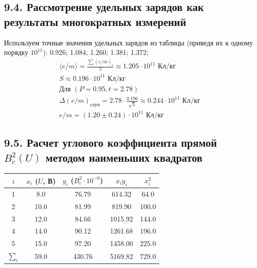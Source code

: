 \documentclass[a4paper,12pt]{article}
\begin{document}
\subsection*{9.4. Рассмотрение удельных зарядов как результаты многократных измерений}
Используем точные значения удельных зарядов из таблицы (приведя их к одному порядку $10^{11}$): 
0.926; 1.084; 1.260; 1.381; 1.372;
\begin{gather*}
    \langle e/m \rangle = \frac{\sum (e/m)_i}{5} \approx 1.205 \cdot 10^{11} \text{ Кл/кг} \\
    S \approx 0.196 \cdot 10^{11} \text{ Кл/кг} \\
    \text{Для } (P = 0.95, t = 2.78) \\
    \Delta(e/m)_{\text{случ}} = 2.78 \cdot \frac{0.196}{\sqrt{5}} \approx 0.244 \cdot 10^{11} \text{ Кл/кг} \\
    e/m = (1.20 \pm 0.24) \cdot 10^{11} \text{ Кл/кг}
\end{gather*}

\subsection*{9.5. Расчет углового коэффициента прямой $B_c^2(U)$ методом наименьших квадратов}
\begin{table}[H]
    \centering
    \begin{tabular}{|c|c|c|c|c|}
        \hline
        $i$ & $x_i$ ($U$, В) & $y_i$ ($B_c^2 \cdot 10^{-6}$) & $x_i y_i$ & $x_i^2$ \\ \hline
        1 & 8.0  & 76.79 & 614.32  & 64.0  \\ \hline
        2 & 10.0 & 81.99 & 819.90  & 100.0 \\ \hline
        3 & 12.0 & 84.66 & 1015.92 & 144.0 \\ \hline
        4 & 14.0 & 90.12 & 1261.68 & 196.0 \\ \hline
        5 & 15.0 & 97.20 & 1458.00 & 225.0 \\ \hline
        $\sum_i$ & 59.0 & 430.76 & 5169.82 & 729.0 \\ \hline
    \end{tabular}
\end{table}
\end{document}
